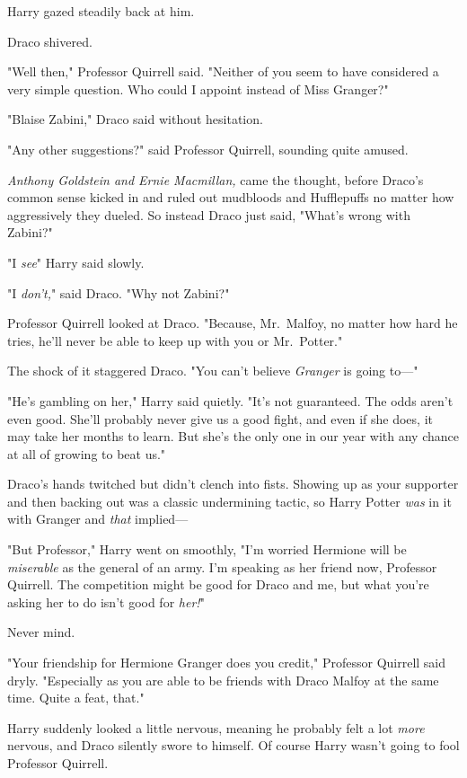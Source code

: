 Harry gazed steadily back at him.

Draco shivered.

"Well then," Professor Quirrell said. "Neither of you seem to have considered a
very simple question. Who could I appoint instead of Miss Granger?"

"Blaise Zabini," Draco said without hesitation.

"Any other suggestions?" said Professor Quirrell, sounding quite amused.

\emph{Anthony Goldstein and Ernie Macmillan,} came the thought, before Draco's
common sense kicked in and ruled out mudbloods and Hufflepuffs no matter how
aggressively they dueled. So instead Draco just said, "What's wrong with
Zabini?"

"I \emph{see}{\el}" Harry said slowly.

"I \emph{don't,}" said Draco. "Why not Zabini?"

Professor Quirrell looked at Draco. "Because, Mr.~Malfoy, no matter how hard he
tries, he'll never be able to keep up with you or Mr.~Potter."

The shock of it staggered Draco. "You can't believe \emph{Granger} is going
to—"

"He's gambling on her," Harry said quietly. "It's not guaranteed. The odds
aren't even good. She'll probably never give us a good fight, and even if she
does, it may take her months to learn. But she's the only one in our year with
any chance at all of growing to beat us."

Draco's hands twitched but didn't clench into fists. Showing up as your
supporter and then backing out was a classic undermining tactic, so Harry
Potter \emph{was} in it with Granger and \emph{that} implied—

"But Professor," Harry went on smoothly, "I'm worried Hermione will be
\emph{miserable} as the general of an army. I'm speaking as her friend now,
Professor Quirrell. The competition might be good for Draco and me, but what
you're asking her to do isn't good for \emph{her!}"

Never mind.

"Your friendship for Hermione Granger does you credit," Professor Quirrell said
dryly. "Especially as you are able to be friends with Draco Malfoy at the same
time. Quite a feat, that."

Harry suddenly looked a little nervous, meaning he probably felt a lot
\emph{more} nervous, and Draco silently swore to himself. Of course Harry
wasn't going to fool Professor Quirrell.

